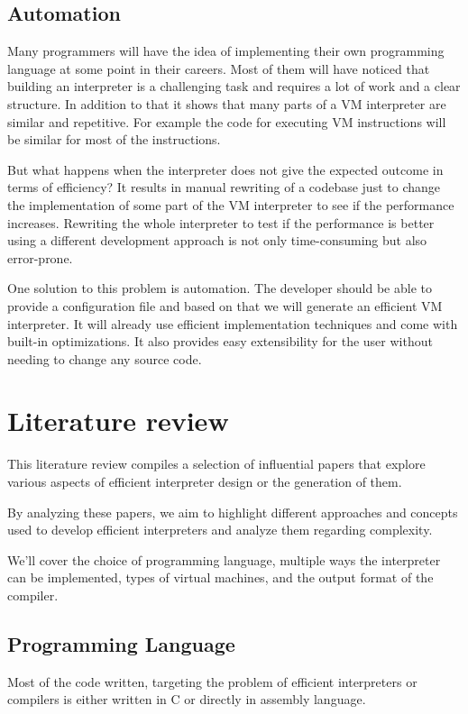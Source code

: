 \documentclass{article}
\begin{document}
\subsection{Automation}
Many programmers will have the idea of implementing their own programming
language at some point in their careers. Most of them will have noticed that
building an interpreter is a challenging task and requires a lot of work and a
clear structure. In addition to that it shows that many parts of a VM
interpreter are similar and repetitive. For example the code for executing VM
instructions will be similar for most of the instructions. ~\cite{vmgen}

But what happens when the interpreter does not give the expected outcome in
terms of efficiency? It results in manual rewriting of a codebase just to
change the implementation of some part of the VM interpreter to see if the
performance increases. Rewriting the whole interpreter to test if the
performance is better using a different development approach is not only
time-consuming but also error-prone.

One solution to this problem is automation. The developer should be able to
provide a configuration file and based on that we will generate an efficient VM
interpreter. It will already use efficient implementation techniques and come
with built-in optimizations. It also provides easy extensibility for the user
without needing to change any source code.

\section{Literature review}
This literature review compiles a selection of influential papers that explore
various aspects of efficient interpreter design or the generation of them. 

By analyzing these papers, we aim to highlight different approaches and
concepts used to develop efficient interpreters and analyze them regarding
complexity.

We'll cover the choice of programming language, multiple ways the interpreter
can be implemented, types of virtual machines, and the output format of the
compiler.

\subsection{Programming Language}
Most of the code written, targeting the problem of efficient interpreters or
compilers is either written in C or directly in assembly language.
\end{document}
